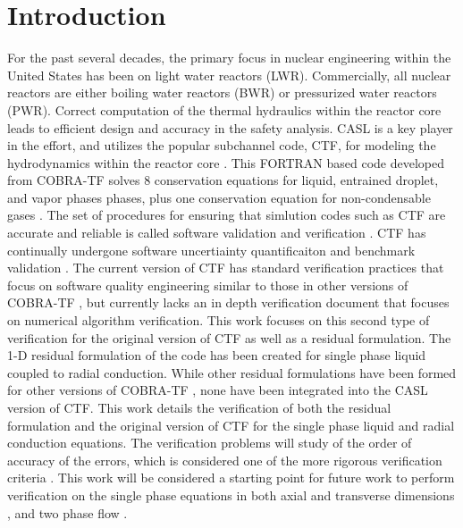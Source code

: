 \vspace*{-80mm}
\chapter{Introduction} \label{chapter1:introduction}

For the past several decades, the primary focus in nuclear engineering within
the United States has been on light water reactors (LWR). Commercially,
all nuclear reactors are either boiling water reactors (BWR) or pressurized
water reactors (PWR). Correct computation of the thermal hydraulics within the
reactor core leads to efficient design and accuracy in the safety analysis. 
CASL is a key player in the effort, and utilizes the popular subchannel code,
CTF, for modeling the hydrodynamics within the reactor core \cite{Schmidt2014}.
This FORTRAN based code developed from COBRA-TF solves 8 conservation equations
for liquid, entrained droplet, and vapor phases phases, plus one conservation
equation for non-condensable gases \cite{CTF_theory}. The set of procedures
for ensuring that simlution codes such as CTF are accurate and reliable is
called software validation and verification \cite{Oberkampf2008}. CTF has
continually undergone software uncertiainty quantificaiton and benchmark
validation \cite{Avramova2015}. The current version of CTF has standard verification
practices that focus on software quality engineering similar to those in other
versions of COBRA-TF \cite{Aumiller2013}, but currently lacks an in depth
verification document that focuses on numerical algorithm verification.
This work focuses on this second type of verification for the original version
of CTF as well as a residual formulation. The 1-D residual formulation of the
code has been created for single phase liquid coupled to radial conduction.
While other residual formulations have been formed for other versions of
COBRA-TF \cite{Lloyd2014}, none have been integrated into the CASL version of
CTF. This work details the verification of both the residual formulation and the
original version of CTF for the single phase liquid and radial conduction
equations. The verification problems will study of the order of accuracy of the
errors, which is considered one of the more rigorous verification criteria
\cite{Roy2005}. This work will be considered a starting point for future work to
perform verification on the single phase equations in both axial and transverse
dimensions \cite{Merroun2009}, and two phase flow \cite{Mahadevan2009}.

